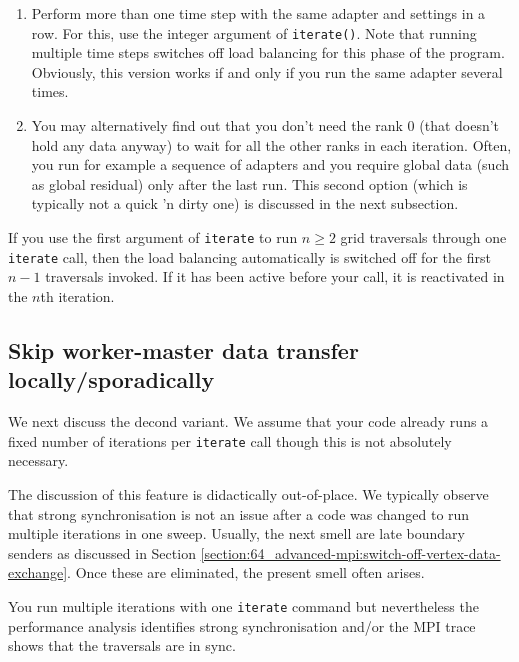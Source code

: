 \begin{enumerate}
  \item Perform more than one time step with the same adapter and settings in a
  row. For this, use the integer argument of \texttt{iterate()}. Note that
  running multiple time steps switches off load balancing for this phase of the program.
  Obviously, this version works if and only if you run the same adapter several 
  times.
  \item You may alternatively find out that you don't need the rank 0 (that
  doesn't hold any data anyway) to wait for all the other ranks in each
  iteration. Often, you run for example a sequence of adapters and you require
  global data (such as global residual) only after the last run. 
  This second option (which is typically not a quick 'n dirty one) is discussed
  in the next subsection. 
\end{enumerate}

\begin{remark}
 If you use the first argument of \texttt{iterate} to run $n\geq 2$ grid
 traversals through one  \texttt{iterate} call, then the load balancing
 automatically is switched off for the first $n-1$ traversals invoked. If
 it has been active before your call, it is reactivated in the $n$th iteration.
\end{remark}


\subsection{Skip worker-master data transfer locally/sporadically}
\label{section:63_mpi-synchronisation:skip-worker-master}

We next discuss the decond variant.
We assume that your code already runs a fixed number of iterations per
\texttt{iterate} call though this is not absolutely necessary.

\begin{remark}
The discussion of this feature is didactically out-of-place. We typically
observe that strong synchronisation is not an issue after a code was changed to
run multiple iterations in one sweep. Usually, the next smell are late boundary
senders as discussed in Section
\ref{section:64_advanced-mpi:switch-off-vertex-data-exchange}. Once these are
eliminated, the present smell often arises.
\end{remark}


\begin{smell}
You run multiple iterations with one \texttt{iterate} command but nevertheless
the performance analysis identifies strong synchronisation and/or
the MPI trace shows that the traversals are in sync.
\end{smell}

